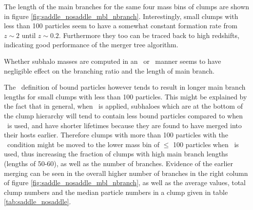 The length of the main branches for the same four mass bins of clumps are shown in figure \ref{fig:saddle_nosaddle_mbl_nbranch}.
Interestingly, small clumps with less than 100 particles seem to have a somewhat constant formation rate from $z \sim 2$ until $z \sim 0.2$.
Furthermore they too can be traced back to high redshifts, indicating good performance of the merger tree algorithm.

Whether subhalo masses are computed in an \exc\ or \inc\ manner seems to have negligible effect on the branching ratio and the length of main branch.

The \sad\ definition of bound particles however tends to result in longer main branch lengths for small clumps with less than 100 particles.
This might be explained by the fact that in general, when \sad\ is applied, subhaloes which are at the bottom of the clump hierarchy will tend to contain less bound particles compared to when \nosad\ is used, and have shorter lifetimes because they are found to have merged into their hosts earlier.
Therefore clumps with more than 100 particles with the \nosad\ condition might be moved to the lower mass bin of $\leq$ 100 particles when \sad\ is used, thus increasing the fraction of clumps with high main branch lengths (lengths of 50-60), as well as the number of branches.
Evidence of the earlier merging can be seen in the overall higher number of branches in the right column of figure \ref{fig:saddle_nosaddle_mbl_nbranch}, as well as the average values, total clump numbers and the median particle numbers in a clump given in table \ref{tab:saddle_nosaddle}.









